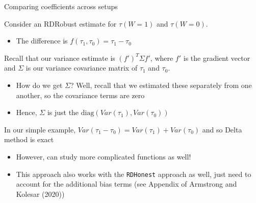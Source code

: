 \documentclass[notes,11pt, aspectratio=169]{beamer}
\newenvironment{wideitemize}{\itemize\addtolength{\itemsep}{10pt}}{\enditemize}
\begin{document}
\begin{frame}{Comparing coefficients across setups}
  \begin{wideitemize}
  \item Consider an RDRobust estimate for $\tau(W=1)$ and $\tau(W=0)$. 
    \begin{itemize}
    \item The difference is $f(\tau_{1}, \tau_{0}) = \tau_{1} - \tau_{0}$
    \end{itemize}
  \item Recall that our variance estimate is $(f')^{T}\Sigma f'$,
    where $f'$ is the gradient vector and $\Sigma$ is our variance
    covariance matrix of $\tau_{1}$ and $\tau_{0}$.
    \begin{itemize}
    \item How do we get $\Sigma$? Well, recall that we estimated these
      separately from one another, so the covariance terms are zero
    \item Hence, $\Sigma$ is just the
      $\text{diag}(Var(\tau_{1}), Var(\tau_{0}))$
    \end{itemize}
  \item In our simple example, $Var(\tau_{1} - \tau_{0}) = Var(\tau_{1}) + Var(\tau_{0})$ and so Delta method is exact
    \begin{itemize}
    \item However, can study more complicated functions as well!
    \item This approach also works with the \texttt{RDHonest} approach
      as well, just need to account for the additional bias terms (see
      Appendix of Armstrong and Kolesar (2020))
    \end{itemize}
  \end{wideitemize}
\end{frame}
\end{document}
